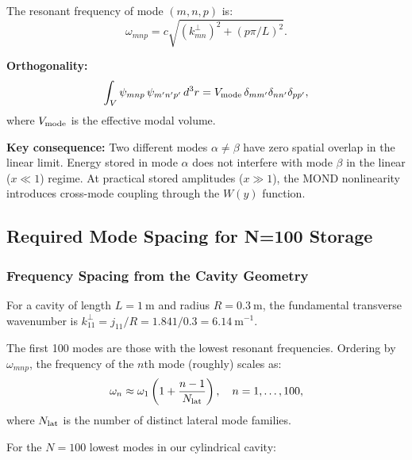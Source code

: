 \documentclass[aps,prd,twocolumn,superscriptaddress]{revtex4-2}
\begin{document}
The resonant frequency of mode $(m,n,p)$ is:
\begin{equation}
\omega_{mnp} = c\sqrt{(k_{mn}^\perp)^2 + (p\pi/L)^2}.
\end{equation}

\textbf{Orthogonality:}
\begin{equation}
\int_V \psi_{mnp}\,\psi_{m'n'p'}\,d^3r
= V_{\rm mode}\,\delta_{mm'}\delta_{nn'}\delta_{pp'},
\end{equation}
where $V_{\rm mode}$ is the effective modal volume.

\textbf{Key consequence:}  Two different modes $\alpha \neq \beta$
have zero spatial overlap in the linear limit.  Energy stored in mode
$\alpha$ does not interfere with mode $\beta$ in the linear
($x \ll 1$) regime.  At practical stored amplitudes ($x \gg 1$),
the MOND nonlinearity introduces cross-mode coupling through the
$W(y)$ function.

\subsection{Required Mode Spacing for N=100 Storage}

\subsubsection{Frequency Spacing from the Cavity Geometry}

For a cavity of length $L = 1~\mathrm{m}$ and radius $R = 0.3~\mathrm{m}$,
the fundamental transverse wavenumber is $k_{11}^\perp = j_{11}/R
= 1.841/0.3 = 6.14~\mathrm{m^{-1}}$.

The first 100 modes are those with the lowest resonant frequencies.
Ordering by $\omega_{mnp}$, the frequency of the $n$th mode (roughly)
scales as:
\begin{equation}
\omega_n \approx \omega_1\left(1 + \frac{n-1}{N_{\rm lat}}\right),
\quad n = 1, \ldots, 100,
\end{equation}
where $N_{\rm lat}$ is the number of distinct lateral mode families.

For the $N = 100$ lowest modes in our cylindrical cavity:
\end{document}
